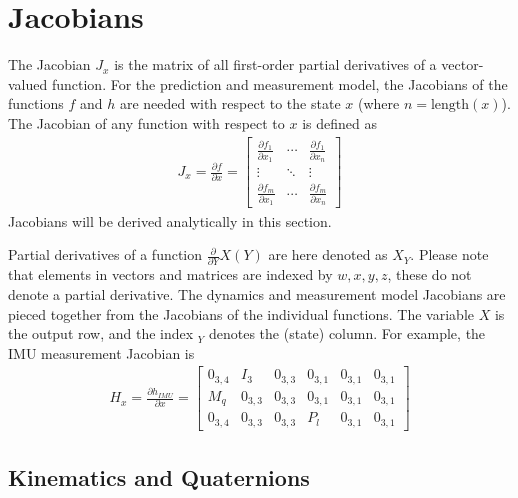 \section{Jacobians}
The Jacobian $J_x$ is the matrix of all first-order partial derivatives of a vector-valued function.
For the prediction and measurement model, the Jacobians of  the functions $f$ and $h$ are needed with respect to the state $x$ (where $n = \mathrm{length}(x)$).
The Jacobian of any function with respect to $x$ is defined as %
\begin{align}
    J_x = \frac{\partial f}{\partial x}
    = \begin{bmatrix}
        \frac{\partial f_1}{\partial x_1} & \cdots & \frac{\partial f_1}{\partial x_n} \\
        \vdots & \ddots & \vdots \\
        \frac{\partial f_m}{\partial x_1} & \cdots & \frac{\partial f_m}{\partial x_n}
    \end{bmatrix}
\end{align}
Jacobians will be derived analytically in this section.

Partial derivatives of a function $\frac{\partial}{\partial Y} X(Y)$ are here denoted as $X_Y$. 
Please note that elements in vectors and matrices are indexed by $w,x,y,z$, these do not denote a partial derivative.
The dynamics and measurement model Jacobians are pieced together from the Jacobians of the individual functions.
The variable $X$ is the output row, and the index $_Y$ denotes the (state) column.
For example, the IMU measurement Jacobian is
\begin{align}
    H_x = \frac{\partial h_{IMU}}{\partial x}
    = \begin{bmatrix}
        0_{3,4} & I_3 & 0_{3,3} & 0_{3,1} & 0_{3,1} & 0_{3,1} \\
        M_q & 0_{3,3} & 0_{3,3} & 0_{3,1} & 0_{3,1} & 0_{3,1} \\
        0_{3,4} & 0_{3,3} & 0_{3,3} & P_l & 0_{3,1} & 0_{3,1}
    \end{bmatrix}
\end{align}

\subsection{Kinematics and Quaternions}

